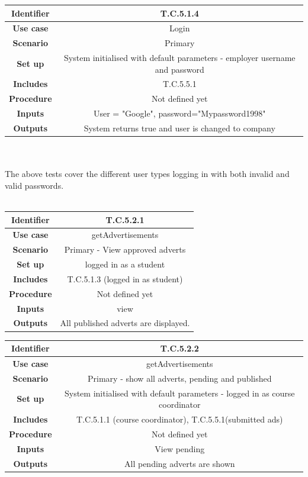 \documentclass{l3deliverable}
\begin{document}
\begin{tabular}{|c|c|}
\hline \textbf{Identifier} & T.C.5.1.4 \\
\hline \textbf{Use case} & Login \\
\hline \textbf{Scenario} & Primary\\
\hline \textbf{Set up} & System initialised with default parameters - employer username and password\\
\hline \textbf{Includes} & T.C.5.5.1\\
\hline \textbf{Procedure} & Not defined yet\\
\hline \textbf{Inputs} & User = "Google", password="Mypassword1998"\\
\hline \textbf{Outputs} & System returns true and user is changed to company\\
\hline
\end{tabular}\\
\\
The above tests cover the different user types logging in with both invalid and valid passwords.\\ 
\\
\begin{tabular}{|c|c|}
\hline \textbf{Identifier} & T.C.5.2.1 \\
\hline \textbf{Use case} & getAdvertisements\\
\hline \textbf{Scenario} & Primary - View approved adverts\\
\hline \textbf{Set up} & logged in as a student\\
\hline \textbf{Includes} & T.C.5.1.3 (logged in as student)\\
\hline \textbf{Procedure} & Not defined yet\\
\hline \textbf{Inputs} & view\\
\hline \textbf{Outputs} & All published adverts are displayed.\\
\hline
\end{tabular}

\begin{tabular}{|c|c|}
\hline \textbf{Identifier} & T.C.5.2.2 \\
\hline \textbf{Use case} & getAdvertisements\\
\hline \textbf{Scenario} & Primary - show all adverts, pending and published\\
\hline \textbf{Set up} & System initialised with default parameters - logged in as course coordinator\\
\hline \textbf{Includes} &T.C.5.1.1 (course coordinator), T.C.5.5.1(submitted ads)\\
\hline \textbf{Procedure} & Not defined yet\\
\hline \textbf{Inputs} & View pending\\
\hline \textbf{Outputs} & All pending adverts are shown\\
\hline
\end{tabular}
\end{document}
